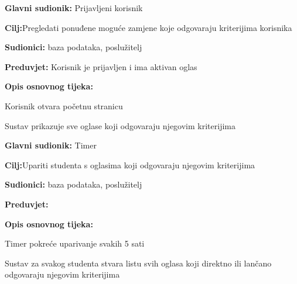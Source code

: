 \noindent {}
\begin{packed_item}
	
	\item \textbf{Glavni sudionik: }Prijavljeni korisnik
	\item  \textbf{Cilj:}Pregledati ponuđene moguće zamjene koje odgovaraju kriterijima korisnika
	\item  \textbf{Sudionici:} baza podataka, poslužitelj
	\item  \textbf{Preduvjet:} Korisnik je prijavljen i ima aktivan oglas
	\item  \textbf{Opis osnovnog tijeka:}
	
	\item[] \begin{packed_enum}
		
		\item Korisnik otvara početnu stranicu
		\item Sustav prikazuje sve oglase koji odgovaraju njegovim kriterijima
		
	\end{packed_enum}
\end{packed_item}
\noindent {}
\begin{packed_item}
	
	\item \textbf{Glavni sudionik: }Timer
	\item  \textbf{Cilj:}Upariti studenta s oglasima koji odgovaraju njegovim kriterijima
	\item  \textbf{Sudionici:} baza podataka, poslužitelj
	\item  \textbf{Preduvjet:}
	\item  \textbf{Opis osnovnog tijeka:}
	
	\item[] \begin{packed_enum}
		
		\item Timer pokreće uparivanje svakih 5 sati
		\item Sustav za svakog studenta stvara listu svih oglasa koji direktno ili lančano odgovaraju njegovim kriterijima
		
	\end{packed_enum}
\end{packed_item}

